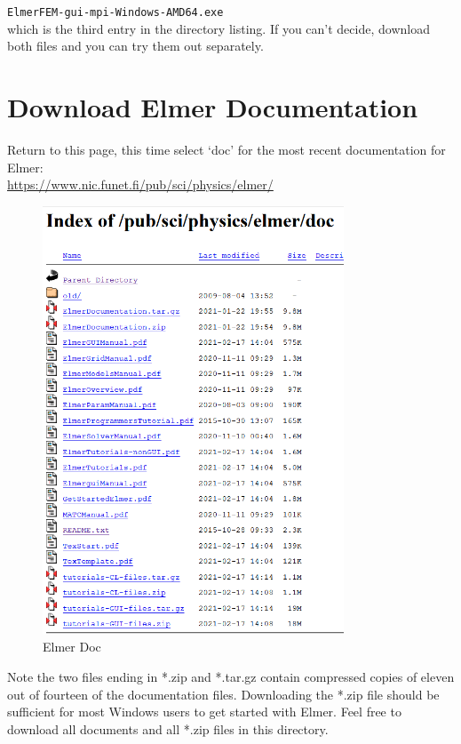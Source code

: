\texttt{ElmerFEM-gui-mpi-Windows-AMD64.exe}\\

which is the third entry in the directory listing.  If you can't decide, download both files and you can try them out separately.


\section{Download Elmer Documentation}

Return to this page, this time select `doc' for the most recent documentation for Elmer:\\

\url{https://www.nic.funet.fi/pub/sci/physics/elmer/}

\begin{figure}[H]
\centering
\includegraphics[width=0.8\textwidth]{elmer-doc}
\caption{Elmer Doc}\label{fg:elmer-doc}
\end{figure}

Note the two files ending in *.zip and *.tar.gz contain compressed copies of eleven out of fourteen of the documentation files.  Downloading the *.zip file should be sufficient for most Windows users to get started with Elmer.  Feel free to download all documents and all *.zip files in this directory.\\

